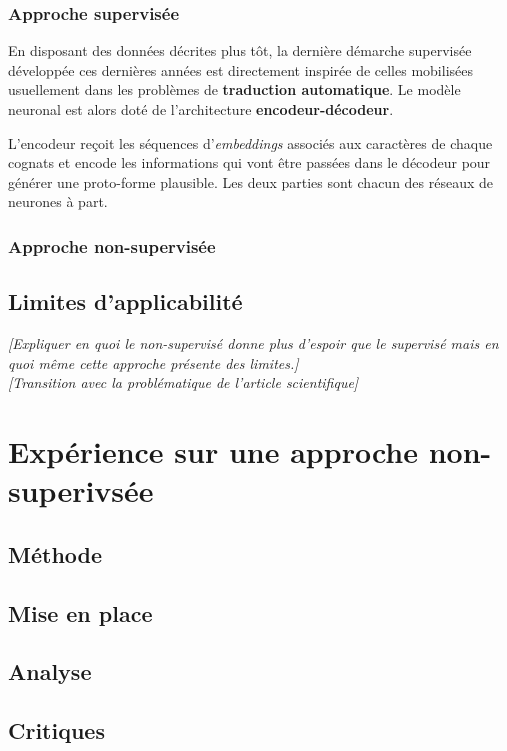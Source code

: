 \documentclass[12pt, french, twoside]{report}
\begin{document}
\subsubsection{Approche supervisée}
En disposant des données décrites plus tôt, la dernière démarche supervisée développée ces dernières années est directement inspirée de celles mobilisées usuellement dans les problèmes de \textbf{traduction automatique}. Le modèle neuronal est alors doté de l'architecture \textbf{encodeur-décodeur}.

L'encodeur reçoit les séquences d'\textit{embeddings} associés aux caractères de chaque cognats et encode les informations qui vont être passées dans le décodeur pour générer une proto-forme plausible. Les deux parties sont chacun des réseaux de neurones à part.

\subsubsection{Approche non-supervisée}

\subsection{Limites d'applicabilité}
\textit{[Expliquer en quoi le non-supervisé donne plus d'espoir que le supervisé mais en quoi même cette approche présente des limites.]}\\
\textit{[Transition avec la problématique de l'article scientifique]}\\

\section{Expérience sur une approche non-superivsée}
\subsection{Méthode}
\subsection{Mise en place}

\subsection{Analyse}
\subsection{Critiques}
\end{document}
